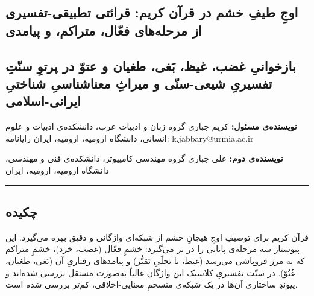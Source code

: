 \documentclass[12pt,a4paper]{article}
\begin{document}
\begin{RTL}
\begin{otherlanguage}{persian}

\section{اوجِ طیفِ خشم در قرآن کریم: قرائتی تطبیقی-تفسیری از مرحله‌های
فعّال، متراکم، و
پیامدی}\label{ux627ux648ux62c-ux637ux6ccux641-ux62eux634ux645-ux62fux631-ux642ux631ux622ux646-ux6a9ux631ux6ccux645-ux642ux631ux627ux626ux62aux6cc-ux62aux637ux628ux6ccux642ux6cc-ux62aux641ux633ux6ccux631ux6cc-ux627ux632-ux645ux631ux62dux644ux647ux647ux627ux6cc-ux641ux639ux627ux644-ux645ux62aux631ux627ux6a9ux645-ux648-ux67eux6ccux627ux645ux62fux6cc}

\subsection{بازخوانیِ غضب، غیظ، بَغی، طغیان و عتوّ در پرتوِ سنّتِ تفسیریِ
شیعی-سنّی و میراثِ معناشناسیِ شناختیِ
ایرانی-اسلامی}\label{ux628ux627ux632ux62eux648ux627ux646ux6cc-ux63aux636ux628-ux63aux6ccux638-ux628ux63aux6cc-ux637ux63aux6ccux627ux646-ux648-ux639ux62aux648-ux62fux631-ux67eux631ux62aux648-ux633ux646ux62a-ux62aux641ux633ux6ccux631ux6cc-ux634ux6ccux639ux6cc-ux633ux646ux6cc-ux648-ux645ux6ccux631ux627ux62b-ux645ux639ux646ux627ux634ux646ux627ux633ux6cc-ux634ux646ux627ux62eux62aux6cc-ux627ux6ccux631ux627ux646ux6cc-ux627ux633ux644ux627ux645ux6cc}

\textbf{نویسنده‌ی مسئول:} کریم جباری گروه زبان و ادبیات عرب، دانشکده‌ی
ادبیات و علوم انسانی، دانشگاه ارومیه، ارومیه، ایران رایانامه:
k.jabbary@urmia.ac.ir

\textbf{نویسنده‌ی دوم:} علی جباری گروه مهندسی کامپیوتر، دانشکده‌ی فنی و
مهندسی، دانشگاه ارومیه، ارومیه، ایران

\begin{center}\rule{0.5\linewidth}{0.5pt}\end{center}

\subsection{چکیده}\label{ux686ux6a9ux6ccux62fux647}

قرآن کریم برای توصیفِ اوجِ هیجانِ خشم از شبکه‌ای واژگانی و دقیق بهره می‌گیرد.
این پیوستار سه مرحله‌ی پایانی را در بر می‌گیرد: خشمِ فعّال (غضب، حَرد)، خشمِ
متراکم که به مرز فروپاشی می‌رسد (غیظ، با تجلّیِ تَمَیُّز) و پیامدهای رفتاریِ آن
(بَغی، طغیان، عُتُوّ). در سنّت تفسیریِ کلاسیک این واژگان غالباً به‌صورت مستقل
بررسی شده‌اند و پیوندِ ساختاری آن‌ها در یک شبکه‌ی منسجمِ معنایی-اخلاقی، کم‌تر
بررسی شده است.


\end{otherlanguage}
\end{RTL}
\end{document}
